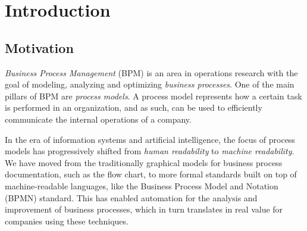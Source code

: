 \chapter{Introduction}
\label{cha:intro}

\section{Motivation}



\textit{Business Process Management} (BPM) is an area in operations research
with the goal of modeling, analyzing and optimizing \textit{business processes}.
One of the main pillars of BPM are \emph{process models}. A process model 
represents how a certain task is performed in an organization, and as such, can be
used to efficiently communicate the internal operations of a company.

In the era of information systems and artificial intelligence, the
focus of process models has progressively shifted from \textit{human readability} to
\textit{machine readability}\cite{ter2009modern}. We have moved from the traditionally graphical
models for business process documentation, such as the flow chart, to more
formal standards built on top of machine-readable languages, like the Business
Process Model and Notation (BPMN)\cite{chinosi2012bpmn} standard. This has
enabled automation for the analysis and improvement of business processes, which
in turn translates in real value for companies using these techniques.

